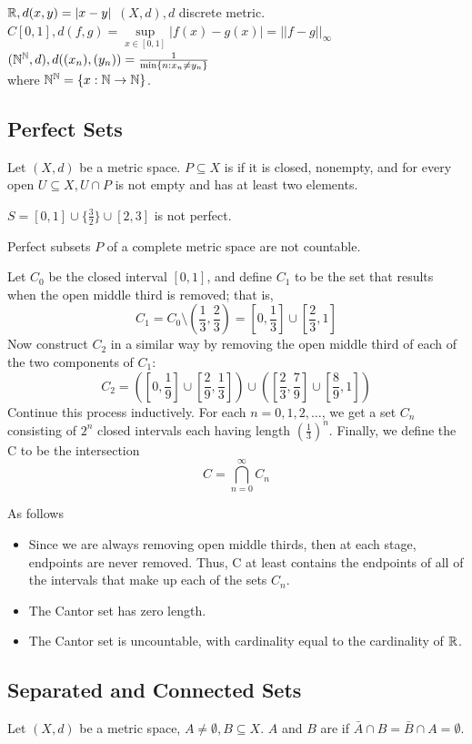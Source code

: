 \documentclass[11pt]{article}
\begin{document}
\example
$\mathbb{R}, d(x,y) = |x - y|$
\example
$(X, d), d$ discrete metric.
\example 
$C[0,1], d(f,g) = \underset{x \in [0, 1]}{\sup} |f(x) - g(x)| = ||f - g||_{\infty}$
\example
$(\mathbb{N}^{\mathbb{N}}, d), d((x_n), (y_n)) = \frac{1}{\min\{n: x_n \neq y_n\}}$
\\
where $\mathbb{N}^{\mathbb{N}} = \{x: \mathbb{N} \rightarrow \mathbb{N}\}$.


\subsection{Perfect Sets}
Let $(X,d)$ be a metric space. $P \subseteq X$ is  if it is closed, nonempty, and for every open $U \subseteq X, U \cap P$ is not empty and has at least two elements.

\example
$S = [0,1] \cup \{\frac{3}{2}\} \cup [2,3]$ is not perfect.

\property Perfect subsets $P$ of a complete metric space are not countable.

 Let $C_0$ be the closed interval $[0,1]$, and define $C_1$ to be the set that results when the open middle third is removed; that is,
$$C_1 = C_0 \setminus (\frac{1}{3}, \frac{2}{3}) = [0, \frac{1}{3}] \cup [\frac{2}{3}, 1]$$
Now construct $C_2$ in a similar way by removing the open middle third of each of the two components of $C_1$:
$$C_2 = ([0, \frac{1}{9}] \cup [\frac{2}{9}, \frac{1}{3}]) \cup ([\frac{2}{3}, \frac{7}{9}] \cup [\frac{8}{9}, 1])$$
Continue this process inductively. For each $n = 0,1,2,\hdots$, we get a set $C_n$ consisting of $2^n$ closed intervals each having length $(\frac{1}{3})^n$. Finally, we define the  C to be the intersection
$$C = \bigcap_{n=0}^\infty C_n$$

\remark As follows
\begin{itemize}
	\item Since we are always removing open middle thirds, then at each stage, endpoints are never removed. Thus, C at least contains the endpoints of all of the intervals that make up each of the sets $C_n$.
	\item The Cantor set has zero length.
	\item The Cantor set is uncountable, with cardinality equal to the cardinality of $\mathbb{R}$.
\end{itemize}

\subsection{Separated and Connected Sets}
Let $(X,d)$ be a metric space, $A \neq \emptyset, B \subseteq X$. $A$ and $B$ are  if $\bar{A} \cap B = \bar{B} \cap A = \emptyset$.
\end{document}
